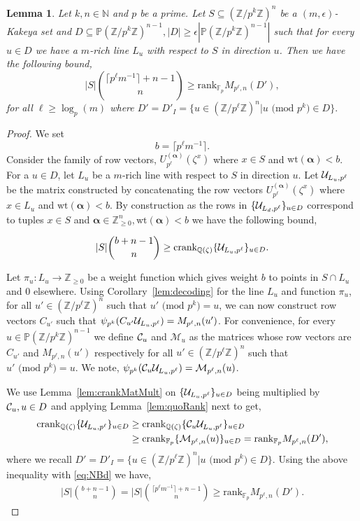 \documentclass[11pt]{article}
\numberwithin{equation}{section}
\newtheorem{lem}[thm]{Lemma}
\def\F{{\mathbb{F}}}
\def\Q{{\mathbb{Q}}}
\def\Z{{\mathbb{Z}}}
\def\N{{\mathbb{N}}}
\def\P{{\mathbb{P}}}
\def\cC{{\cal C}}
\def\cU{{\cal U}}
\def\cM{\mathcal{M}}
\def\balpha{{\bm \alpha}}
\begin{document}
\begin{lem}\label{fm:rkBd}
Let $k,n\in \N$ and $p$ be a prime. Let $S\subseteq (\Z/p^k\Z)^n$ be a $(m,\epsilon)$-Kakeya set and $D\subseteq \P (\Z/p^k\Z)^{n-1},|D|\ge \epsilon |\P (\Z/p^k\Z)^{n-1}|$ such that for every $u\in D$ we have a $m$-rich line $L_u$ with respect to $S$ in direction $u$. Then we have the following bound,
{\em $$ |S|\binom{\lceil p^\ell m^{-1} \rceil+n-1}{n} \ge \text{rank}_{\F_p} M_{p^\ell,n}(D'),$$}
for all $\ell \ge \log_p(m)$ where {\em$D'=D'_I=\{u\in (\Z/p^\ell\Z)^{n}| u\text{ (mod }p^k\text{)}\in D\}.$}
\end{lem}
\begin{proof}
We set
$$b=\lceil p^\ell m^{-1} \rceil.$$
Consider the family of row vectors, $U_{p^\ell}^{(\balpha)}(\zeta^x)$ where $x\in S$ and $\text{wt}(\balpha)<b$. For a $u\in D$, let $L_u$ be a $m$-rich line with respect to $S$ in direction $u$. Let $\cU_{L_u,p^\ell}$ be the matrix constructed by concatenating the row vectors $U_{p^\ell}^{(\balpha)}(\zeta^x)$ where $x\in L_u$ and $\text{wt}(\balpha)<b$. By construction as the rows in $\{\cU_{L_d,p^\ell}\}_{u\in D}$ correspond to tuples $x\in S$ and $\balpha\in \Z_{\ge 0}^n, \text{wt}(\balpha)<b$ we have the following bound,

\begin{align}\label{eq:NBd}
    |S|\binom{b+n-1}{n} \ge \text{crank}_{\Q(\zeta)} \{\cU_{L_u,p^\ell}\}_{u\in D}.
\end{align}

Let $\pi_u:L_u\rightarrow \Z_{\ge 0}$ be a weight function which gives weight $b$ to points in $S\cap L_u$ and $0$ elsewhere. Using Corollary~\ref{lem:decoding} for the line $L_u$ and function $\pi_u$, for all $u' \in (\Z/p^\ell\Z)^{n}$ such that $u' \text{ (mod }p^k\text{)}=u$, we can now construct row vectors $C_{u'}$ such that $\psi_{p^k}(C_{u'}\cU_{L_u,p^\ell})=M_{p^\ell,n}(u')$.  For convenience, for every $u\in \P (\Z/p^k\Z)^{n-1}$ we define $\cC_u$ and $\cM_u$ as the matrices whose row vectors are $C_{u'}$ and $M_{p^\ell,n}(u')$ respectively for all $u'\in (\Z/p^\ell\Z)^{n}$ such that $u' \text{ (mod }p^k\text{)}=u$. We note, $\psi_{p^k}(\cC_{u}\cU_{L_u,p^\ell})=\cM_{p^\ell,n}(u)$.

We use Lemma~\ref{lem:crankMatMult} on $\{\cU_{L_u,p^\ell}\}_{u\in D}$ being multiplied by $\cC_u,u\in D$ and applying Lemma~\ref{lem:quoRank} next to get,
\begin{align*}
    \text{crank}_{\Q(\zeta)} \{\cU_{L_u,p^\ell}\}_{u\in D}&\ge \text{crank}_{\Q(\zeta)} \{\cC_{u}\cU_{L_u,p^\ell}\}_{u\in D}\\
    &\ge  \text{crank}_{\F_p} \{\cM_{p^\ell,n}(u)\}_{u\in D}=\text{rank}_{\F_p} M_{p^\ell,n}(D'),
\end{align*}
where we recall $D'=D'_I=\{u\in (\Z/p^\ell\Z)^{n}| u\text{ (mod }p^k\text{)}\in D\}.$
Using the above inequality with \eqref{eq:NBd} we have,
\begin{align*}
|S|\binom{b+n-1}{n}=    |S|\binom{\lceil p^\ell m^{-1} \rceil+n-1}{n}\ge  \text{rank}_{\F_p} M_{p^\ell,n}(D').
\end{align*}
\end{proof}
\end{document}
